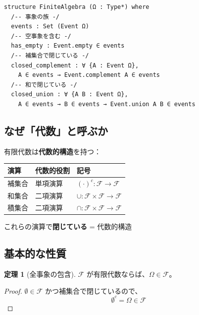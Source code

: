 \documentclass[12pt,a4paper,ja=standard]{bxjsarticle}
\theoremstyle{definition}
\newtheorem{theorem}[definition]{定理}
\begin{document}
\begin{tcolorbox}[title=Lean コード（170--179 行目）]
\begin{verbatim}
structure FiniteAlgebra (Ω : Type*) where
  /-- 事象の族 -/
  events : Set (Event Ω)
  /-- 空事象を含む -/
  has_empty : Event.empty ∈ events
  /-- 補集合で閉じている -/
  closed_complement : ∀ {A : Event Ω}, 
    A ∈ events → Event.complement A ∈ events
  /-- 和で閉じている -/
  closed_union : ∀ {A B : Event Ω}, 
    A ∈ events → B ∈ events → Event.union A B ∈ events
\end{verbatim}
\end{tcolorbox}

\subsection{なぜ「代数」と呼ぶか}

\begin{insight}
有限代数は\textbf{代数的構造}を持つ：

\begin{center}
\begin{tabular}{|l|l|l|}
\hline
\textbf{演算} & \textbf{代数的役割} & \textbf{記号} \\
\hline
補集合 & 単項演算 & $(\cdot)^c : \mathcal{F} \to \mathcal{F}$ \\
和集合 & 二項演算 & $\cup : \mathcal{F} \times \mathcal{F} \to \mathcal{F}$ \\
積集合 & 二項演算 & $\cap : \mathcal{F} \times \mathcal{F} \to \mathcal{F}$ \\
\hline
\end{tabular}
\end{center}

これらの演算で\textbf{閉じている} = 代数的構造
\end{insight}

\subsection{基本的な性質}

\begin{theorem}[全事象の包含]
$\mathcal{F}$ が有限代数ならば、$\Omega \in \mathcal{F}$。
\end{theorem}

\begin{proof}
$\emptyset \in \mathcal{F}$ かつ補集合で閉じているので、
\[
\emptyset^c = \Omega \in \mathcal{F}
\]
\end{proof}
\end{document}
